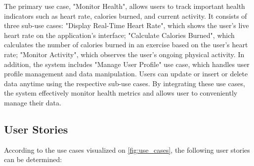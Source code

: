 The primary use case, "Monitor Health", allows users to track important health indicators such as heart rate, calories burned, and current activity. It consists of three sub-use cases: "Display Real-Time Heart Rate", which shows the user's live heart rate on the application's interface; "Calculate Calories Burned", which calculates the number of calories burned in an exercise based on the user's heart rate;  "Monitor Activity", which observes the user's ongoing physical activity. In addition, the system includes "Manage User Profile" use case, which handles user profile management and data manipulation. Users can update or insert or delete data anytime using the respective sub-use cases. By integrating these use cases, the system effectively monitor health metrics and allows user to conveniently manage their data.

\subsection{User Stories}
According to the use cases visualized on \autoref{fig:use_cases}, the following user stories can be determined:


